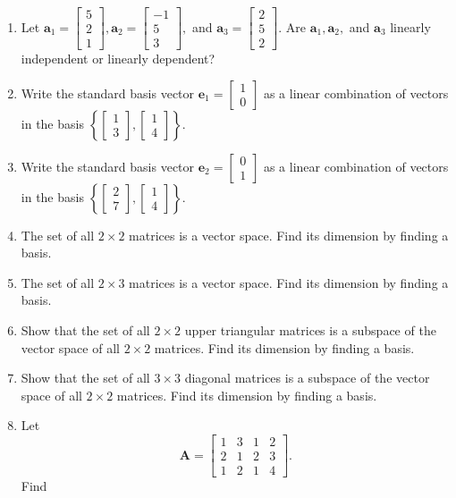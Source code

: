 \documentclass[
]{book}
\theoremstyle{definition}
\theoremstyle{definition}
\theoremstyle{definition}
\theoremstyle{definition}
\theoremstyle{remark}
\begin{document}
\begin{enumerate}
\item
  Let
  \(\mathbf{a}_1=\begin{bmatrix}5\\2\\1\end{bmatrix},\mathbf{a}_2=\begin{bmatrix}-1\\5\\3\end{bmatrix},\) and \(\mathbf{a}_3=\begin{bmatrix} 2\\5\\2\end{bmatrix}.\) Are \(\mathbf{a}_1,\mathbf{a}_2,\) and \(\mathbf{a}_3\) linearly independent or linearly dependent?
\item
  Write the standard basis vector \(\mathbf{e}_1=\begin{bmatrix}1\\0\end{bmatrix}\) as a linear combination of vectors in the basis \(\left\{\begin{bmatrix}1\\3\end{bmatrix},\begin{bmatrix}1\\4\end{bmatrix}\right\}.\)
\item
  Write the standard basis vector \(\mathbf{e}_2=\begin{bmatrix}0\\1\end{bmatrix}\) as a linear combination of vectors in the basis \(\left\{\begin{bmatrix}2\\7\end{bmatrix},\begin{bmatrix}1\\4\end{bmatrix}\right\}.\)
\item
  The set of all \(2\times 2\) matrices is a vector space. Find its dimension by finding a basis.
\item
  The set of all \(2\times 3\) matrices is a vector space. Find its dimension by finding a basis.
\item
  Show that the set of all \(2\times 2\) upper triangular matrices is a subspace of the vector space of all \(2\times 2\) matrices. Find its dimension by finding a basis.
\item
  Show that the set of all \(3\times 3\) diagonal matrices is a subspace of the vector space of all \(2\times 2\) matrices. Find its dimension by finding a basis.
\item
  Let
  \[\mathbf{A}=\begin{bmatrix}1 & 3 & 1 & 2\\2 & 1 & 2 & 3\\1 & 2 & 1 & 4\end{bmatrix}.\]
  Find


\end{enumerate}
\end{document}
